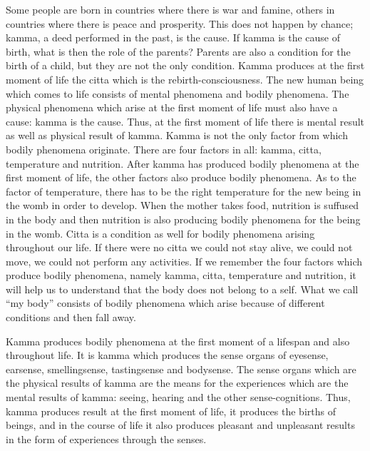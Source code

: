 \documentclass{book}
\begin{document}
Some people are born in countries where there is war and famine, others
in countries where there is peace and prosperity. This does not happen
by chance; kamma, a deed performed in the past, is the cause. If kamma
is the cause of birth, what is then the role of the parents? Parents are
also a condition for the birth of a child, but they are not the only
condition. Kamma produces at the first moment of life the citta which is
the rebirth-consciousness. The new human being which comes to life
consists of mental phenomena and bodily phenomena. The physical
phenomena which arise at the first moment of life must also have a
cause: kamma is the cause. Thus, at the first moment of life there is
mental result as well as physical result of kamma. Kamma is not the only
factor from which bodily phenomena originate. There are four factors in
all: kamma, citta, temperature and nutrition. After kamma has produced
bodily phenomena at the first moment of life, the other factors also
produce bodily phenomena. As to the factor of temperature, there has to
be the right temperature for the new being in the womb in order to
develop. When the mother takes food, nutrition is suffused in the body
and then nutrition is also producing bodily phenomena for the being in
the womb. Citta is a condition as well for bodily phenomena arising
throughout our life. If there were no citta we could not stay alive, we
could not move, we could not perform any activities. If we remember the
four factors which produce bodily phenomena, namely kamma, citta,
temperature and nutrition, it will help us to understand that the body
does not belong to a self. What we call ``my body'' consists of bodily
phenomena which arise because of different conditions and then fall
away.

Kamma produces bodily phenomena at the first moment of a lifespan and
also throughout life. It is kamma which produces the sense organs of
eyesense, earsense, smellingsense, tastingsense and bodysense. The sense
organs which are the physical results of kamma are the means for the
experiences which are the mental results of kamma: seeing, hearing and
the other sense-cognitions. Thus, kamma produces result at the first
moment of life, it produces the births of beings, and in the course of
life it also produces pleasant and unpleasant results in the form of
experiences through the senses.
\end{document}
